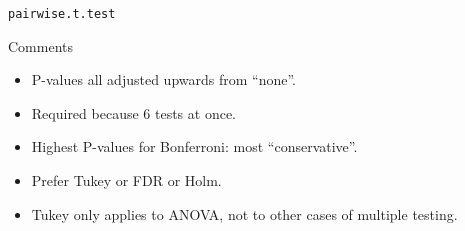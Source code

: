 \documentclass[unknownkeysallowed]{beamer}\usepackage[]{graphicx}\usepackage[]{color}
\begin{document}
\begin{frame}[fragile]{\texttt{pairwise.t.test}}
\begin{multicols}{2}
  \end{multicols}
  
\end{frame}

\begin{frame}[fragile]{Comments}
  
  \begin{itemize}
  \item P-values all adjusted upwards from ``none''.
  \item Required because 6 tests at once.
  \item Highest P-values for Bonferroni: most ``conservative''.
  \item Prefer Tukey or FDR or Holm.
  \item Tukey only applies to ANOVA, not to other cases of multiple
    testing. 
  \end{itemize}
  
\end{frame}
\end{document}
